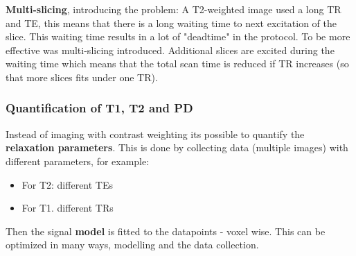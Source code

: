 		\textbf{Multi-slicing}, introducing the problem: A T2-weighted image used a long TR and TE, this means that there is a long waiting time to next excitation of the slice. This waiting time results in a lot of "deadtime" in the protocol. To be more effective was multi-slicing introduced. Additional slices are excited during the waiting time which means that the total scan time is reduced if TR increases (so that more slices fits under one TR).

		\subsubsection*{Quantification of T1, T2 and PD}
		Instead of imaging with contrast weighting its possible to quantify the \textbf{relaxation parameters}. This is done by collecting data (multiple images) with different parameters, for example:

			\begin{itemize}
				\item For T2: different TEs
				\item For T1. different TRs 
			\end{itemize}

		 Then the signal \textbf{model} is fitted to the datapoints - voxel wise. This can be optimized in many ways, modelling and the data collection.  


		    
		

		          
		
		

		
			







	